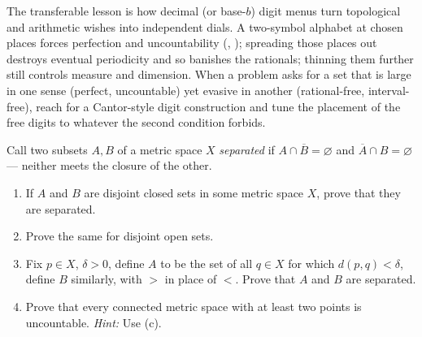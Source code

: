 \documentclass[main.tex]{subfiles}
\begin{document}
\begin{Reflection}
The transferable lesson is how decimal (or base-$b$) digit menus turn topological and arithmetic wishes
into independent dials. A two-symbol alphabet at chosen places forces perfection and uncountability
(, ); spreading those
places out destroys eventual periodicity and so banishes the rationals; thinning them further still
controls measure and dimension. When a problem asks for a set that is large in one sense (perfect,
uncountable) yet evasive in another (rational-free, interval-free), reach for a Cantor-style digit
construction and tune the placement of the free digits to whatever the second condition forbids.
\end{Reflection}

Call two subsets $A,B$ of a metric space $X$ \emph{separated} if $A\cap\overline{B}=\varnothing$ and
$\overline{A}\cap B=\varnothing$ --- neither meets the closure of the other.
\begin{enumerate}[leftmargin=1.7em,itemsep=2pt,topsep=2pt,label=\textnormal{(\alph*)}]
  \item If $A$ and $B$ are disjoint closed sets in some metric space $X$, prove that they are
        separated.
  \item Prove the same for disjoint open sets.
  \item Fix $p\in X$, $\delta>0$, define $A$ to be the set of all $q\in X$ for which $d(p,q)<\delta$,
        define $B$ similarly, with $>$ in place of $<$. Prove that $A$ and $B$ are separated.
  \item Prove that every connected metric space with at least two points is uncountable.
        \emph{Hint:} Use (c).
\end{enumerate}
\end{document}
